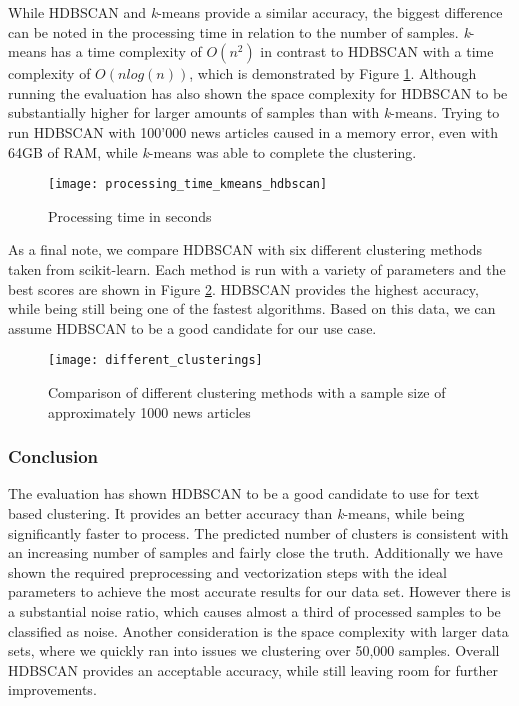 While HDBSCAN and \textit{k}-means provide a similar accuracy, the biggest difference can be noted in the processing time in relation to the number of samples. \textit{k}-means has a time complexity of $O(n^2)$ in contrast to HDBSCAN with a time complexity of $O(nlog(n))$, which is demonstrated by Figure \ref{fig:processing_time_kmeans_hdbscan}. Although running the evaluation has also shown the space complexity for HDBSCAN to be substantially higher for larger amounts of samples than with \textit{k}-means. Trying to run HDBSCAN with 100'000 news articles caused in a memory error, even with 64GB of RAM, while \textit{k}-means was able to complete the clustering.


\begin{figure}[h]
    \centering
    \texttt{[image: processing\_time\_kmeans\_hdbscan]}
    \caption{Processing time in seconds }
    \label{fig:processing_time_kmeans_hdbscan}
\end{figure}


As a final note, we compare HDBSCAN with six different clustering methods taken from scikit-learn. Each method is run with a variety of parameters and the best scores are shown in Figure \ref{fig:different_clusterings}. HDBSCAN provides the highest accuracy, while being still being one of the fastest algorithms. Based on this data, we can assume HDBSCAN to be a good candidate for our use case.
\begin{figure}[h]
    \centering
    \texttt{[image: different\_clusterings]}
    \caption{Comparison of different clustering methods with a sample size of approximately 1000 news articles}
    \label{fig:different_clusterings}
\end{figure}

\subsubsection{Conclusion}

The evaluation has shown HDBSCAN to be a good candidate to use for text based clustering. It provides an better accuracy than \textit{k}-means, while being significantly faster to process. The predicted number of clusters is consistent with an increasing number of samples and fairly close the truth. Additionally we have shown the required preprocessing and vectorization steps with the ideal parameters to achieve the most accurate results for our data set. However there is a substantial noise ratio, which causes almost a third of processed samples to be classified as noise. Another consideration is the space complexity  with larger data sets, where we quickly ran into issues we clustering over 50,000 samples. Overall HDBSCAN provides an acceptable accuracy, while still leaving room for further improvements.

